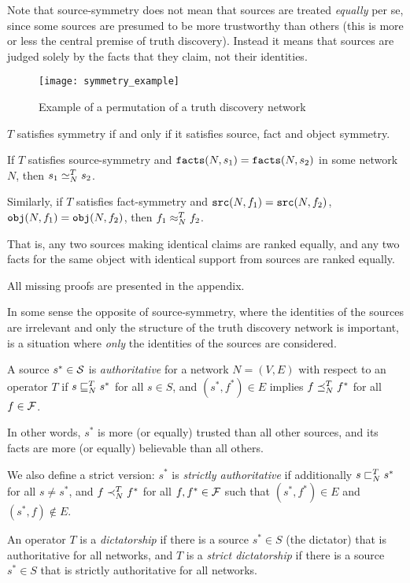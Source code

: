 \documentclass[../main.tex]{subfiles}
\begin{document}
Note that source-symmetry does not mean that sources are treated \emph{equally}
per se, since some sources are presumed to be more trustworthy than others
(this is more or less the central premise of truth discovery). Instead it means
that sources are judged solely by the facts that they claim, not their
identities.

\begin{figure}
    \centering
    \texttt{[image: symmetry\_example]}
    \caption{Example of a permutation of a truth discovery network}
    \label{img:permutation_of_a_tdn}
\end{figure}

\begin{proposition}
\label{prop:symm_iff_fact_source_object_symm}
$T$ satisfies symmetry if and only if it satisfies source, fact and object
symmetry.
\end{proposition}

\begin{proposition}
\label{prop:same_facts_ranked_equally}
If $T$ satisfies source-symmetry and $\fact(N, s_1) = \fact(N, s_2)$ in some
network $N$, then $s_1 \seq_N^T s_2$.

Similarly, if $T$ satisfies fact-symmetry and $\src(N, f_1) = \src(N, f_2)$,
$\obj(N, f_1) = \obj(N, f_2)$, then $f_1 \feq_N^T f_2$.

That is, any two sources making identical claims are ranked equally, and any
two facts for the same object with identical support from sources are ranked
equally.
\end{proposition}

All missing proofs are presented in the appendix.

In some sense the opposite of source-symmetry, where the identities of the
sources are irrelevant and only the structure of the truth discovery network is
important, is a situation where \emph{only} the identities of the sources are
considered.

\begin{definition}

A source $s^* \in \S$ is \emph{authoritative} for a network $N=(V, E)$ with
respect to an operator $T$ if $s \sle_N^T s^*$ for all $s \in S$, and $(s^*,
f^*) \in E$ implies $f \fle_N^T f^*$ for all $f \in \F$.

In other words, $s^*$ is more (or equally) trusted than all other sources, and
its facts are more (or equally) believable than all others.

We also define a strict version: $s^*$ is \emph{strictly authoritative} if
additionally $s \slt_N^T s^*$ for all $s \ne s^*$, and $f \flt_N^T f^*$ for all
$f, f^* \in \F$ such that $(s^*, f^*) \in E$ and $(s^*, f) \notin E$.

An operator $T$ is a \emph{dictatorship} if there is a source $s^* \in S$ (the
dictator) that is authoritative for all networks, and $T$ is a \emph{strict
dictatorship} if there is a source $s^* \in S$ that is strictly authoritative
for all networks.

\end{definition}
\end{document}
